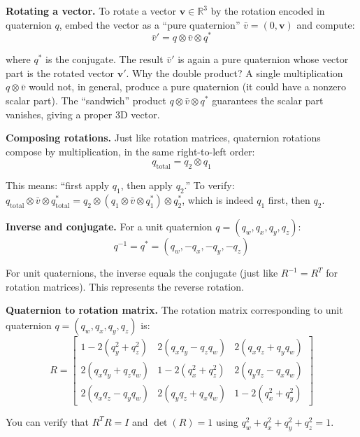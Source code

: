 \textbf{Rotating a vector.} To rotate a vector $\mathbf{v} \in \mathbb{R}^3$ by the rotation encoded in quaternion $q$, embed the vector as a ``pure quaternion'' $\bar{v} = (0, \mathbf{v})$ and compute:
\begin{equation}
\bar{v}' = q \otimes \bar{v} \otimes q^*
\end{equation}

where $q^*$ is the conjugate. The result $\bar{v}'$ is again a pure quaternion whose vector part is the rotated vector $\mathbf{v}'$. Why the double product? A single multiplication $q \otimes \bar{v}$ would not, in general, produce a pure quaternion (it could have a nonzero scalar part). The ``sandwich'' product $q \otimes \bar{v} \otimes q^*$ guarantees the scalar part vanishes, giving a proper 3D vector.

\textbf{Composing rotations.} Just like rotation matrices, quaternion rotations compose by multiplication, in the same right-to-left order:
\begin{equation}
q_{\text{total}} = q_2 \otimes q_1
\end{equation}

This means: ``first apply $q_1$, then apply $q_2$.'' To verify: $q_{\text{total}} \otimes \bar{v} \otimes q_{\text{total}}^* = q_2 \otimes (q_1 \otimes \bar{v} \otimes q_1^*) \otimes q_2^*$, which is indeed $q_1$ first, then $q_2$.

\textbf{Inverse and conjugate.} For a unit quaternion $q = (q_w, q_x, q_y, q_z)$:
\begin{equation}
q^{-1} = q^* = (q_w, -q_x, -q_y, -q_z)
\end{equation}

For unit quaternions, the inverse equals the conjugate (just like $R^{-1} = R^T$ for rotation matrices). This represents the reverse rotation.

\textbf{Quaternion to rotation matrix.} The rotation matrix corresponding to unit quaternion $q = (q_w, q_x, q_y, q_z)$ is:
\begin{equation}
R = \begin{bmatrix}
1 - 2(q_y^2 + q_z^2) & 2(q_x q_y - q_z q_w) & 2(q_x q_z + q_y q_w) \\
2(q_x q_y + q_z q_w) & 1 - 2(q_x^2 + q_z^2) & 2(q_y q_z - q_x q_w) \\
2(q_x q_z - q_y q_w) & 2(q_y q_z + q_x q_w) & 1 - 2(q_x^2 + q_y^2)
\end{bmatrix}
\end{equation}

You can verify that $R^T R = I$ and $\det(R) = 1$ using $q_w^2 + q_x^2 + q_y^2 + q_z^2 = 1$.


